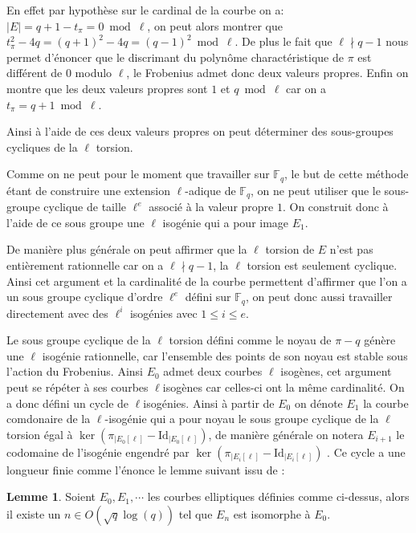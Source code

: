 \documentclass[10pt,a4paper]{book}
\theoremstyle{plain}
\theoremstyle{definition}
\newtheorem{lem}[thm]{Lemme}
\theoremstyle{definition}
\theoremstyle{definition}
\theoremstyle{definition}
\theoremstyle{remark}
\theoremstyle{remark}
\begin{document}
En effet par hypothèse sur le cardinal de la courbe on a: $|E|=q+1-t_{\pi}=0 \bmod \ell$, on peut alors montrer que $t_{\pi}^2-4q=(q+1)^2-4q=(q-1)^2 \bmod \ell$. De plus le fait que $\ell \nmid q-1$ nous permet d'énoncer que le discrimant du polynôme charactéristique de $\pi$ est différent de $0$ modulo $\ell$, le Frobenius admet donc deux valeurs propres. Enfin on montre que les deux valeurs propres sont $1$ et $q \bmod \ell$ car on a $t_{\pi}=q+1 \bmod \ell$.

Ainsi à l'aide de ces deux valeurs propres on peut déterminer des sous-groupes cycliques de la $\ell$ torsion. 

Comme on ne peut pour le moment que travailler sur $\mathbb{F}_q$, le but de cette méthode étant de construire une extension $\ell$-adique de $\mathbb{F}_q$, on ne peut utiliser que le sous-groupe cyclique de taille $\ell^e$ associé à la valeur propre $1$. On construit donc à l'aide de ce sous groupe une $\ell$ isogénie qui a pour image $E_1$. 

De manière plus générale  on peut affirmer que la $\ell$ torsion de $E$ n'est pas entièrement rationnelle car on a $\ell \nmid q-1$, la $\ell$ torsion est seulement cyclique. Ainsi cet argument et la cardinalité de la courbe permettent d'affirmer que l'on a un sous groupe cyclique d'ordre $\ell^e$ défini sur $\mathbb{F}_q$, on peut donc aussi travailler directement avec des $\ell^i$ isogénies avec $1 \leqslant i \leqslant e$.

Le sous groupe cyclique de la $\ell$ torsion défini comme le noyau de $\pi -q$ génère une $\ell$ isogénie rationnelle, car l'ensemble des points de son noyau est stable sous l'action du Frobenius. Ainsi $E_0$ admet deux courbes $\ell$ isogènes, cet argument peut se répéter à ses courbes $\ell$isogènes car celles-ci ont la même cardinalité. On a donc défini un cycle de $\ell$isogénies. Ainsi à partir de $E_0$ on dénote $E_1$ la courbe comdonaire de la $\ell$-isogénie qui a pour noyau le sous groupe cyclique de la $\ell$ torsion égal à $\ker (\pi_{|E_0[\ell]} - \mathrm{Id}_{|E_0[\ell]})$, de manière générale on notera $E_{i+1}$ le codomaine de l'isogénie engendré par $\ker (\pi_{|E_i[\ell]} - \mathrm{Id}_{|E_i[\ell]})$ . Ce cycle a une longueur finie comme l'énonce le lemme suivant issu de \cite{DeFeo-Doliskani-Schost13}:

\begin{lem}
Soient $E_0,E_1, \cdots$ les courbes elliptiques définies comme ci-dessus, alors il existe un $n \in O(\sqrt{q}\log(q))$ tel que $E_n$ est isomorphe à $E_0$.
\end{lem}
\end{document}
